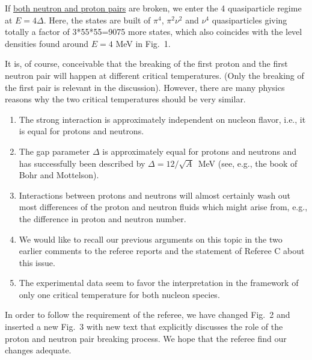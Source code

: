 \documentclass{letter}
\begin{document}
If \underline{both neutron and proton pairs} are broken, we enter the 4 quasiparticle regime at $E=4\Delta$. Here, the states are built of $\pi^4$, $\pi^2\nu^2$ and $\nu^4$ quasiparticles giving totally a factor of 3*55*55=9075 more states, which also coincides with the level densities found around $E=4$ MeV in Fig.\ 1. 

It is, of course, conceivable that the breaking of the first proton and the 
first neutron pair will happen at different critical temperatures. (Only the 
breaking of the first pair is relevant in the discussion). However, there are
many physics reasons why the two critical temperatures should be very similar. 

\begin{enumerate}
\item The strong interaction is approximately independent on nucleon flavor,
i.e., it is equal for protons and neutrons.
\item The gap parameter $\Delta$ is approximately equal for protons and 
neutrons and has successfully been described by $\Delta=12/\sqrt{A}$~MeV (see,
e.g., the book of Bohr and Mottelson).
\item Interactions between protons and neutrons will almost certainly wash out
most differences of the proton and neutron fluids which might arise from, e.g.,
the difference in proton and neutron number.
\item We would like to recall our previous arguments on this topic in the two 
earlier comments to the referee reports and the statement of Referee C about 
this issue.
\item The experimental data seem to favor the interpretation in the framework
of only one critical temperature for both nucleon species.
\end{enumerate}

In order to follow the requirement of the referee, we have changed Fig.\ 2 and inserted a new Fig.\ 3 with new text that explicitly discusses the role of the proton and neutron pair breaking process. We hope that the referee find our changes adequate.
\end{document}
